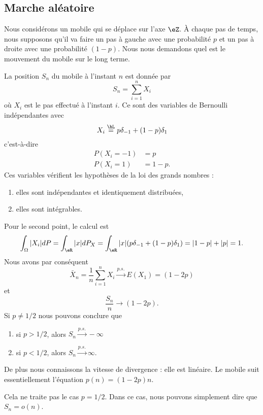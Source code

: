 \subsection{Marche aléatoire}

Nous considérons un mobile qui se déplace sur l'axe \( \eZ\). À chaque pas de temps, nous supposons qu'il va faire un pas à gauche avec une probabilité \( p\) et un pas à droite avec une probabilité \( (1-p)\). Nous nous demandons quel est le mouvement du mobile sur le long terme.

La position \( S_n\) du mobile à l'instant \( n\) est donnée par
\begin{equation}
	S_n=\sum_{i=1}^nX_i
\end{equation}
où \( X_i\) est le pas effectué à l'instant \( i\). Ce sont des variables de Bernoulli indépendantes avec
\begin{equation}
	X_i\stackrel{\hL}{=}p\delta_{-1}+(1-p)\delta_1
\end{equation}
c'est-à-dire
\begin{subequations}
	\begin{align}
		P(X_i=-1) & =p    \\
		P(X_i=1)  & =1-p.
	\end{align}
\end{subequations}
Ces variables vérifient les hypothèses de la loi des grands nombres :
\begin{enumerate}
	\item
	      elles sont indépendantes et identiquement distribuées,
	\item
	      elles sont intégrables.
\end{enumerate}
Pour le second point, le calcul est
\begin{equation}
	\int_{\Omega}| X_i |dP=\int_{\eR}| x |dP_X=\int_{\eR}| x |(p\delta_{-1}+(1-p)\delta_{1})=| 1-p |+| p |=1.
\end{equation}
Nous avons par conséquent
\begin{equation}
	\bar X_n=\frac{1}{ n }\sum_{i=1}^nX_i\stackrel{p.s.}{\longrightarrow} E(X_1)=(1-2p)
\end{equation}
et
\begin{equation}
	\frac{ S_n }{ n }\to(1-2p).
\end{equation}
Si \( p\neq 1/2\) nous pouvons conclure que
\begin{enumerate}
	\item
	      si \( p>1/2\), alors \( S_n\stackrel{p.s.}{\longrightarrow}-\infty\)
	\item
	      si \( p<1/2\), alors \( S_n\stackrel{p.s.}{\longrightarrow}\infty\).
\end{enumerate}
De plus nous connaissons la vitesse de divergence : elle est linéaire. Le mobile suit essentiellement l'équation
\( p(n)=(1-2p)n\).

\begin{remark}
	Cela ne traite pas le cas \( p=1/2\). Dans ce cas, nous pouvons simplement dire que \( S_n=o(n)\).
\end{remark}
